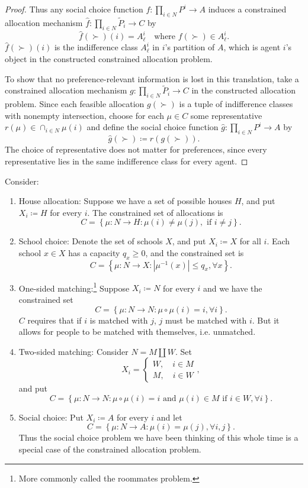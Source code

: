 \begin{proof}
	Thus any social choice function $f: \prod_{i \in N}^{} P^i \to A$ induces a constrained allocation mechanism $\hat{f}: \prod_{i \in N}^{} \tilde{P}_i \to C$ by \[
		\hat{f}(\succ)(i) = A_\ell^i
		\quad \text{where } f(\succ) \in A_\ell^i
	.\] 
	$\hat{f}(\succ)(i)$ is the indifference class $A_\ell^{i}$ in $i$'s partition of $A$, which is agent $i$'s object in the constructed constrained allocation problem.

	To show that no preference-relevant information is lost in this translation, take a constrained allocation mechanism $g: \prod_{i \in N}^{} \tilde{P}_i \to C$ in the constructed allocation problem.
	Since each feasible allocation $g(\succ)$ is a tuple of indifference classes with nonempty intersection, choose for each $\mu \in C$ some representative $r(\mu) \in \cap_{i \in N} \mu(i)$ and define the social choice function $\hat{g}: \prod_{i \in N}^{} P^i \to A$ by \[
		\hat{g}(\succ) \coloneqq r(g(\succ))
	.\] 
	The choice of representative does not matter for preferences, since every representative lies in the same indifference class for every agent.
\end{proof}

\begin{example}
	Consider:
	\begin{enumerate}[label = (\roman*)]
		\item House allocation: Suppose we have a set of possible houses $H$, and put $X_i \coloneqq H$ for every $i$. The constrained set of allocations is \[
			C = \left\{\mu: N \to H: \mu(i) \ne \mu(j), \text{ if } i \ne j\right\}
		.\] 
		\item School choice: Denote the set of schools $X$, and put $X_i \coloneqq X$ for all $i$. Each school $x \in X$ has a capacity $q_x \ge 0$, and the constrained set is \[
			C = \left\{\mu: N \to X: \left| \mu^{-1}(x) \right| \le q_x, \forall x\right\}
		.\] 
		\item One-sided matching:\footnote{More commonly called the roommates problem.} Suppose $X_i \coloneqq N$ for every $i$ and we have the constrained set \[
			C = \left\{\mu: N \to N : \mu\circ \mu (i) = i, \forall i\right\}
		.\] 
		$C$ requires that if $i$ is matched with $j$, $j$ must be matched with $i$. But it allows for people to be matched with themselves, i.e. unmatched.
		\item Two-sided matching: Consider $N = M \amalg W$. Set \[
			X_i = \begin{cases}
				W, \quad i \in M \\ M, \quad i \in W
			\end{cases}
		,\] and put \[
			C = \left\{\mu: N \to N: \mu \circ \mu(i) = i \text{ and } \mu(i) \in M \text{ if } i \in W, \forall i\right\} 
		.\] 
		\item Social choice: Put $X_i \coloneqq A$ for every $i$ and let \[
			C = \left\{\mu: N \to A : \mu(i) = \mu(j), \forall i,j\right\}
		.\] Thus the social choice problem we have been thinking of this whole time is a special case of the constrained allocation problem.
	\end{enumerate}
\end{example}

